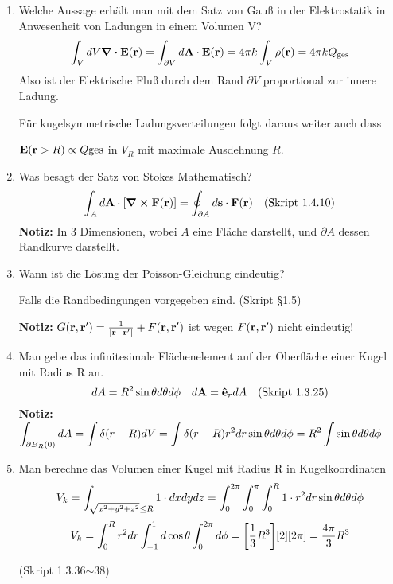 \begin{enumerate}
  \item Welche Aussage erhält man mit dem Satz von Gauß in der 
        Elektrostatik in Anwesenheit von Ladungen in einem Volumen V?
        \begin{equation*}
          \int_V dV \div \vb E(\vb r) 
          = \int_{\partial V} d\vb A \cdot \vb E(\vb r) 
          = 4\pi k \int_V \rho(\vb r)
          = 4\pi k Q_{\text{ges}}
        \end{equation*}
        Also ist der Elektrische Fluß durch dem Rand $\partial V$ 
        proportional zur innere Ladung.

        Für kugelsymmetrische Ladungsverteilungen folgt daraus weiter auch
        dass 
        \begin{center}
        $\vb E(\vb r > R)\propto Q{\text{ges}}$ in $V_R$ mit maximale
        Ausdehnung $R$.
        \end{center}

  \item Was besagt der Satz von Stokes Mathematisch?
        $$\displaystyle \int_A d\vb A \cdot \qty[\curl \vb F(\vb r)]=
         \oint_{\partial A}d\vb s\cdot \vb F(\vb r)
         \quad\text{(Skript 1.4.10)}$$
        \textbf{Notiz:} In 3 Dimensionen, wobei $A$ eine Fläche 
        darstellt,
        und $\partial A$ dessen Randkurve darstellt.

  \item Wann ist die Lösung der Poisson-Gleichung eindeutig?
        \begin{center}
          Falls die Randbedingungen vorgegeben sind. (Skript §1.5)
        \end{center}
        \textbf{Notiz:} $G(\vb r, \vb r')=\frac{1}{\abs{\vb{r}-\vb{r}'}} + F(\vb r, \vb r')$ 
        ist wegen $F(\vb r, \vb r')$ nicht eindeutig!
        
  \item Man gebe das infinitesimale Flächenelement auf der Oberfläche 
        einer Kugel mit Radius R an.
        $$\displaystyle dA = R^2\sin\theta d\theta d\phi
        \quad d\vb A = \vu e_r dA \quad\text{(Skript 1.3.25)}$$
        \textbf{Notiz:} $\displaystyle\int_{\partial B_R(0)} dA=\int\delta(r-R)dV
         =\int \delta(r-R)r^2dr\sin\theta d\theta d\phi
         =R^2 \int \sin\theta d\theta d\phi$

  \item Man berechne das Volumen einer Kugel mit Radius R 
        in Kugelkoordinaten\\
        $$\displaystyle V_k=\int_{\sqrt{x^2+y^2+z^2}\le R} 1\cdot dxdydz
         =\int_0^{2\pi}\int_0^\pi\int_0^R 1\cdot r^2dr 
          \sin\theta d\theta d\phi$$
        $$\displaystyle V_k=\int_0^R r^2 dr \int_{-1}^{1} d\cos\theta 
                 \int_0^{2\pi}d\phi
         =\qty[\frac{1}{3}R^3]\qty[2]\qty[2\pi]=\frac{4\pi}{3}R^3$$
        \begin{center}
          (Skript 1.3.36$\sim$38)
        \end{center}


\end{enumerate}
